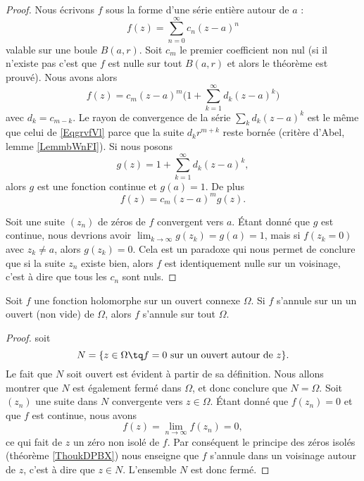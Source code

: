 \begin{proof}
    Nous écrivons \( f\) sous la forme d'une série entière autour de \( a\) :
    \begin{equation}        \label{EqgrvfVl}
        f(z)=\sum_{n=0}^{\infty}c_n(z-a)^n
    \end{equation}
    valable sur une boule \( B(a,r)\). Soit \( c_m\) le premier coefficient non nul (si il n'existe pas c'est que \( f\) est nulle sur tout \( B(a,r) \) et alors le théorème est prouvé). Nous avons alors
    \begin{equation}
        f(z)=c_m(z-a)^m\big( 1+\sum_{k=1}^{\infty}d_k(z-a)^k \big)
    \end{equation}
    avec \( d_k=c_{m-k}\). Le rayon de convergence de la série \( \sum_k d_k(z-a)^k\) est le même que celui de \eqref{EqgrvfVl} parce que la suite \( d_kr^{m+k}\) reste bornée (critère d'Abel, lemme \ref{LemmbWnFI}). Si nous posons
    \begin{equation}
        g(z)=1+\sum_{k=1}^{\infty}d_k(z-a)^k,
    \end{equation}
    alors \( g\) est une fonction continue et \( g(a)=1\). De plus 
    \begin{equation}
        f(z)=c_m(z-a)^mg(z).
    \end{equation}

    Soit une suite \( (z_n)\) de zéros de \( f\) convergent vers \( a\). Étant donné que \( g\) est continue, nous devrions avoir \( \lim_{k\to\infty}g(z_k)=g(a)=1\), mais si \( f(z_k=0)\) avec \( z_k\neq a\), alors \( g(z_k)=0\). Cela est un paradoxe qui nous permet de conclure que si la suite \( z_n\) existe bien, alors \( f\) est identiquement nulle sur un voisinage, c'est à dire que tous les \( c_n\) sont nuls.
\end{proof}

\begin{corollary}
    Soit \( f\) une fonction holomorphe sur un ouvert connexe \( \Omega\). Si \( f\) s'annule sur un un ouvert (non vide) de \( \Omega\), alors \( f\) s'annule sur tout \( \Omega\).
\end{corollary}

\begin{proof}
    soit 
    \begin{equation}
        N=\{ z\in \Omega\tq f=0\text{ sur un ouvert autour de $z$} \}.
    \end{equation}
    Le fait que \( N\) soit ouvert est évident à partir de sa définition. Nous allons montrer que \( N\) est également fermé dans \( \Omega\), et donc conclure que \( N=\Omega\). Soit \( (z_n)\) une suite dans \( N\) convergente vers \( z\in \Omega\). Étant donné que \( f(z_n)=0\) et que \( f\) est continue, nous avons
    \begin{equation}
        f(z)=\lim_{n\to \infty} f(z_n)=0,
    \end{equation}
    ce qui fait de \( z\) un zéro non isolé de \( f\). Par conséquent le principe des zéros isolés (théorème \ref{ThoukDPBX}) nous enseigne que \( f\) s'annule dans un voisinage autour de \( z\), c'est à dire que \( z\in N\). L'ensemble \( N\) est donc fermé.
\end{proof}

